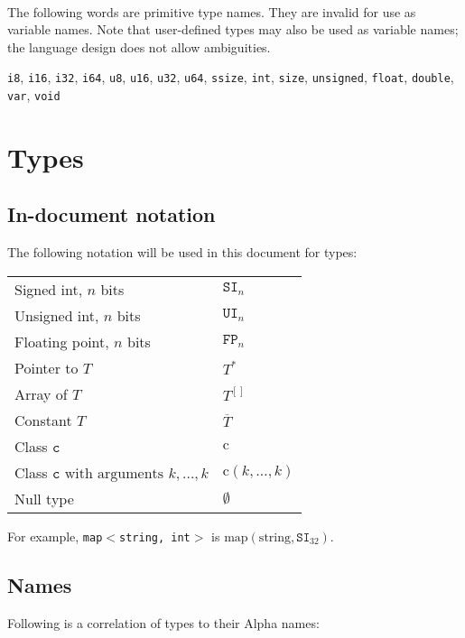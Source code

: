 \documentclass{article}
\newcommand{\R}[1]{\mathtt{#1}}
\newcommand{\K}[1]{\mathrm{#1}}
\begin{document}
\ \\

The following words are primitive type names. They are invalid for use as
variable names. Note that user-defined types may also be used as variable names;
the language design does not allow ambiguities.

\texttt{i8},
\texttt{i16},
\texttt{i32},
\texttt{i64},
\texttt{u8},
\texttt{u16},
\texttt{u32},
\texttt{u64},
\texttt{ssize},
\texttt{int},
\texttt{size},
\texttt{unsigned},
\texttt{float},
\texttt{double},
\texttt{var},
\texttt{void}

\section{Types}
\label{sec:types}

\subsection{In-document notation}
\label{sub:types:indoc}
The following notation will be used in this document for types:

\begin{tabular}{|l|l|}
\hline
Signed int, $n$ bits & $\R{SI}_n$ \\
Unsigned int, $n$ bits & $\R{UI}_n$ \\
Floating point, $n$ bits & $\R{FP}_n$ \\
Pointer to $T$ & $T^*$ \\
Array of $T$ & $T^{[]}$ \\
Constant $T$ & $\overline{T}$ \\
Class $\R{c}$ & $\K{c}$ \\
Class $\R{c} \textrm{ with arguments } k, \ldots, k$ & $\K{c}(k, \ldots, k)$ \\
Null type & $\emptyset$ \\
\hline
\end{tabular}

For example, \texttt{map$<$string, int$>$} is
$\K{map}(\K{string}, \R{SI}_{32})$.

\subsection{Names}
\label{sub:types:names}
Following is a correlation of types to their Alpha names:
\end{document}
